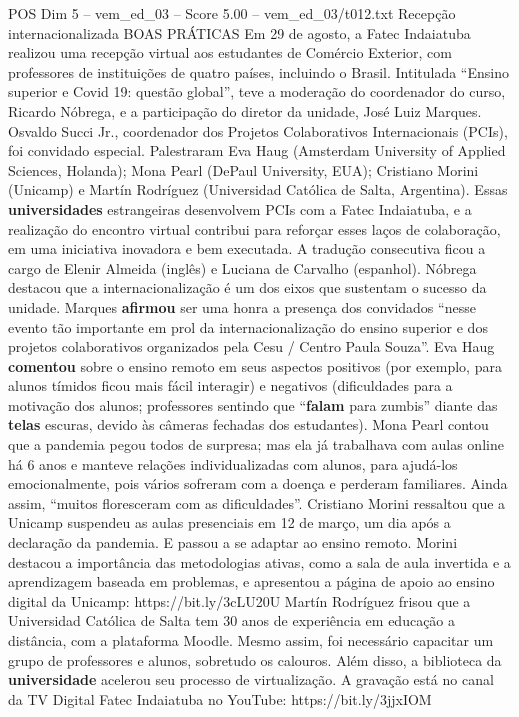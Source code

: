 \begin{textsample}{POS Dim 5 – vem\_ed\_03 – Score 5.00 – vem\_ed\_03/t012.txt}  \label{ex:f5_pos_053}
Recepção internacionalizada BOAS PRÁTICAS Em 29 de agosto, a Fatec Indaiatuba realizou uma recepção virtual aos estudantes de Comércio Exterior, com professores de instituições de quatro países, incluindo o Brasil.
Intitulada “Ensino superior e Covid 19: questão global”, teve a moderação do coordenador do curso, Ricardo Nóbrega, e a participação do diretor da unidade, José Luiz Marques.
Osvaldo Succi Jr., coordenador dos Projetos Colaborativos Internacionais (PCIs), foi convidado especial.
Palestraram Eva Haug (Amsterdam University of Applied Sciences, Holanda); Mona Pearl (DePaul University, EUA); Cristiano Morini (Unicamp) e Martín Rodríguez (Universidad Católica de Salta, Argentina).
Essas \textbf{universidades} estrangeiras desenvolvem PCIs com a Fatec Indaiatuba, e a realização do encontro virtual contribui para reforçar esses laços de colaboração, em uma iniciativa inovadora e bem executada.
A tradução consecutiva ficou a cargo de Elenir Almeida (inglês) e Luciana de Carvalho (espanhol).
Nóbrega destacou que a internacionalização é um dos eixos que sustentam o sucesso da unidade.
Marques \textbf{afirmou} ser uma honra a presença dos convidados “nesse evento tão importante em prol da internacionalização do ensino superior e dos projetos colaborativos organizados pela Cesu / Centro Paula Souza”.
Eva Haug \textbf{comentou} sobre o ensino remoto em seus aspectos positivos (por exemplo, para alunos tímidos ficou mais fácil interagir) e negativos (dificuldades para a motivação dos alunos; professores sentindo que “\textbf{falam} para zumbis” diante das \textbf{telas} escuras, devido às câmeras fechadas dos estudantes).
Mona Pearl contou que a pandemia pegou todos de surpresa; mas ela já trabalhava com aulas online há 6 anos e manteve relações individualizadas com alunos, para ajudá-los emocionalmente, pois vários sofreram com a doença e perderam familiares.
Ainda assim, “muitos floresceram com as dificuldades”.
Cristiano Morini ressaltou que a Unicamp suspendeu as aulas presenciais em 12 de março, um dia após a declaração da pandemia.
E passou a se adaptar ao ensino remoto.
Morini destacou a importância das metodologias ativas, como a sala de aula invertida e a aprendizagem baseada em problemas, e apresentou a página de apoio ao ensino digital da Unicamp: https://bit.ly/3cLU20U Martín Rodríguez frisou que a Universidad Católica de Salta tem 30 anos de experiência em educação a distância, com a plataforma Moodle.
Mesmo assim, foi necessário capacitar um grupo de professores e alunos, sobretudo os calouros.
Além disso, a biblioteca da \textbf{universidade} acelerou seu processo de virtualização.
A gravação está no canal da TV Digital Fatec Indaiatuba no YouTube: https://bit.ly/3jjxIOM

\end{textsample}
